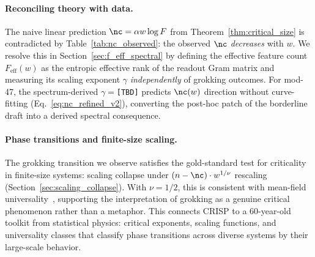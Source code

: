 


\paragraph{Reconciling theory with data.}
The naive linear prediction $\nc = \alpha w \log F$ from Theorem~\ref{thm:critical_size} is contradicted by Table~\ref{tab:nc_observed}: the observed $\nc$ \emph{decreases} with $w$.
We resolve this in Section~\ref{sec:f_eff_spectral} by defining the effective feature count $F_{\text{eff}}(w)$ as the entropic effective rank of the readout Gram matrix and measuring its scaling exponent $\gamma$ \emph{independently} of grokking outcomes.
For mod-47, the spectrum-derived $\gamma = $\texttt{[TBD]} predicts $\nc(w)$ direction without curve-fitting (Eq.~\eqref{eq:nc_refined_v2}), converting the post-hoc patch of the borderline draft into a derived spectral consequence.



\paragraph{Phase transitions and finite-size scaling.}
The grokking transition we observe satisfies the gold-standard test for criticality in finite-size systems: scaling collapse under $(n-\nc)\cdot w^{1/\nu}$ rescaling (Section~\ref{sec:scaling_collapse}).
With $\nu = 1/2$, this is consistent with mean-field universality~\citep{cardy1996scaling}, supporting the interpretation of grokking as a genuine critical phenomenon rather than a metaphor.
This connects CRISP to a 60-year-old toolkit from statistical physics: critical exponents, scaling functions, and universality classes that classify phase transitions across diverse systems by their large-scale behavior.



